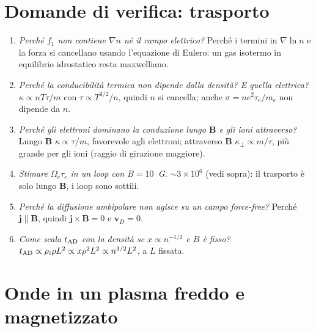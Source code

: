\section{Domande di verifica: trasporto}
\begin{enumerate}
\item \textit{Perché $f_1$ non contiene $\nabla n$ né il campo elettrico?} Perché i termini in $\nabla\ln n$ e la forza si cancellano usando l'equazione di Eulero: un gas isotermo in equilibrio idrostatico resta maxwelliano.
\item \textit{Perché la conducibilità termica non dipende dalla densità? E quella elettrica?} $\kappa\propto nT\tau/m$ con $\tau\propto T^{3/2}/n$, quindi $n$ si cancella; anche $\sigma=ne^2\tau_e/m_e$ non dipende da $n$.
\item \textit{Perché gli elettroni dominano la conduzione lungo $\mathbf{B}$ e gli ioni attraverso?} Lungo $\mathbf{B}$ $\kappa\propto\tau/m$, favorevole agli elettroni; attraverso $\mathbf{B}$ $\kappa_\perp\propto m/\tau$, più grande per gli ioni (raggio di girazione maggiore).
\item \textit{Stimare $\Omega_e\tau_e$ in un loop con $B=10$~G.} $\sim3\times10^6$ (vedi sopra): il trasporto è solo lungo $\mathbf{B}$, i loop sono sottili.
\item \textit{Perché la diffusione ambipolare non agisce su un campo force-free?} Perché $\mathbf{j}\parallel\mathbf{B}$, quindi $\mathbf{j}\times\mathbf{B}=0$ e $\mathbf{v}_D=0$.
\item \textit{Come scala $t_{\rm AD}$ con la densità se $x\propto n^{-1/2}$ e $B$ è fisso?} $t_{\rm AD}\propto\rho_i\rho L^2\propto x\rho^2L^2\propto n^{3/2}L^2$, a $L$ fissata.
\end{enumerate}

\section{Onde in un plasma freddo e magnetizzato}
